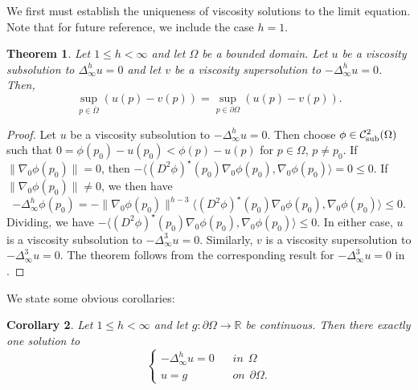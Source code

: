 \documentclass[12pt]{amsart}
\newtheorem{thm}{Theorem}[section]
\newtheorem{corollary}[thm]{Corollary}
\theoremstyle{definition}
\theoremstyle{remark}
\numberwithin{equation}{section}
\begin{document}
We first must establish the uniqueness of viscosity solutions to the limit equation. Note that for future reference, we include the case $h=1$. 
\begin{thm}
Let $1\leq h< \infty$ and let $\Omega$ be a bounded domain. Let $u$ be a viscosity subsolution to $\Delta^h_\infty u =0$ 
and let $v$ be a viscosity supersolution to $-\Delta^h_\infty u =0$.
Then,
\begin{equation*}
\sup_{p \in \overline{\Omega}} (u(p)-v(p)) = \sup_{p \in \partial \Omega} (u(p)-v(p)).
\end{equation*}
\end{thm} 
\begin{proof}
Let $u$ be a viscosity subsolution to $-\Delta^h_\infty u =0$. Then choose $\phi \in {\operatorname{\mathcal{C}^2_{\textmd{sub}}}}(\Omega)$ such that  $0 = \phi(p_0) - u(p_0) < \phi(p) - u(p)$ for $p \in \Omega$, $p \neq p_0$. 
If $\|\nabla_0 \phi(p_0)\| = 0$, then $-{\ensuremath{\langle {(D^2\phi)^\star(p_0)\nabla_0\phi(p_0)} , {\nabla_0\phi(p_0)} \rangle}} = 0 \leq 0$.
If $\|\nabla_0 \phi(p_0)\| \neq 0$, we then have
$$-\Delta^h_\infty \phi(p_0) = -\|\nabla_0\phi(p_0)\|^{h-3}{\ensuremath{\langle {(D^2\phi)^\star(p_0)\nabla_0\phi(p_0)} , {\nabla_0\phi(p_0)} \rangle}} \leq 0.$$ 
Dividing, we have $-{\ensuremath{\langle {(D^2\phi)^\star(p_0)\nabla_0\phi(p_0)} , {\nabla_0\phi(p_0)} \rangle}} \leq 0$.  In either case, $u$ is a viscosity subsolution to $-\Delta^3_\infty u=0$. Similarly, $v$ is a viscosity supersolution to $-\Delta^3_\infty u=0$. The theorem follows from the corresponding result for $-\Delta^3_\infty u=0$ in \cite{B:MP, B:HG, W:W}.  
\end{proof}
We state some obvious corollaries:
\begin{corollary}
Let $1\leq h< \infty$ and let $g:\partial \Omega \to \mathbb{R}$ be continuous. Then there exactly  one solution to 
\begin{equation*}
\left\{ \begin{array}{cl}
-\Delta^h_\infty u =0 & \hspace{10pt} in \hspace{5pt} \Omega \\ 
u=g & \hspace{10pt} on \hspace{5pt} \partial \Omega. 
\end{array}\right.
\end{equation*}
\end{corollary}
\end{document}
